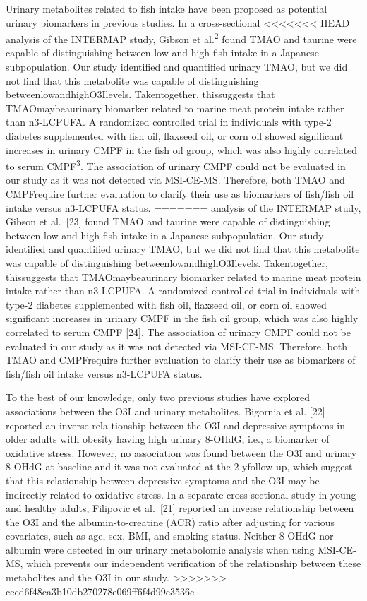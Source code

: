 \documentclass[journal=jacsat,manuscript=article]{achemso}
\begin{document}
Urinary metabolites related to fish intake have been proposed as
potential urinary biomarkers in previous studies. In a cross-sectional
<<<<<<< HEAD
analysis of the INTERMAP study, Gibson et al.\textsuperscript{2} found
TMAO and taurine were capable of distinguishing between low and high
fish intake in a Japanese subpopulation. Our study identified and
quantified urinary TMAO, but we did not find that this metabolite was
capable of distinguishing betweenlowandhighO3Ilevels. Takentogether,
thissuggests that TMAOmaybeaurinary biomarker related to marine meat
protein intake rather than n3-LCPUFA. A randomized controlled trial in
individuals with type-2 diabetes supplemented with fish oil, flaxseed
oil, or corn oil showed significant increases in urinary CMPF in the
fish oil group, which was also highly correlated to serum
CMPF\textsuperscript{3}. The association of urinary CMPF could not be
evaluated in our study as it was not detected via MSI-CE-MS. Therefore,
both TMAO and CMPFrequire further evaluation to clarify their use as
biomarkers of fish/fish oil intake versus n3-LCPUFA status.
=======
analysis of the INTERMAP study, Gibson et al.~{[}23{]} found TMAO and
taurine were capable of distinguishing between low and high fish intake
in a Japanese subpopulation. Our study identified and quantified urinary
TMAO, but we did not find that this metabolite was capable of
distinguishing betweenlowandhighO3Ilevels. Takentogether, thissuggests
that TMAOmaybeaurinary biomarker related to marine meat protein intake
rather than n3-LCPUFA. A randomized controlled trial in individuals with
type-2 diabetes supplemented with fish oil, flaxseed oil, or corn oil
showed significant increases in urinary CMPF in the fish oil group,
which was also highly correlated to serum CMPF {[}24{]}. The association
of urinary CMPF could not be evaluated in our study as it was not
detected via MSI-CE-MS. Therefore, both TMAO and CMPFrequire further
evaluation to clarify their use as biomarkers of fish/fish oil intake
versus n3-LCPUFA status.

To the best of our knowledge, only two previous studies have explored
associations between the O3I and urinary metabolites. Bigornia et al.
{[}22{]} reported an inverse rela tionship between the O3I and
depressive symptoms in older adults with obesity having high urinary
8-OHdG, i.e., a biomarker of oxidative stress. However, no association
was found between the O3I and urinary 8-OHdG at baseline and it was not
evaluated at the 2 yfollow-up, which suggest that this relationship
between depressive symptoms and the O3I may be indirectly related to
oxidative stress. In a separate cross-sectional study in young and
healthy adults, Filipovic et al.~{[}21{]} reported an inverse
relationship between the O3I and the albumin-to-creatine (ACR) ratio
after adjusting for various covariates, such as age, sex, BMI, and
smoking status. Neither 8-OHdG nor albumin were detected in our urinary
metabolomic analysis when using MSI-CE-MS, which prevents our
independent verification of the relationship between these metabolites
and the O3I in our study.
>>>>>>> cecd6f48ca3b10db270278e069ff6f4d99c3536c
\end{document}
